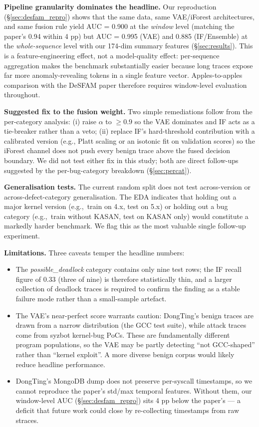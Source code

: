 \documentclass[conference,10pt]{IEEEtran}
\begin{document}
\textbf{Pipeline granularity dominates the headline.} Our reproduction
(\S\ref{sec:desfam_repro}) shows that the same data, same VAE/iForest
architectures, and same fusion rule yield AUC = 0.900 at the
\emph{window} level (matching the paper's 0.94 within 4 pp) but
AUC = 0.995 (VAE) and 0.885 (IF/Ensemble) at the \emph{whole-sequence}
level with our 174-dim summary features (\S\ref{sec:results}). This is a
feature-engineering effect, not a model-quality effect: per-sequence
aggregation makes the benchmark substantially easier because long traces
expose far more anomaly-revealing tokens in a single feature vector.
Apples-to-apples comparison with the DeSFAM paper therefore requires
window-level evaluation throughout.

\textbf{Suggested fix to the fusion weight.} Two simple remediations
follow from the per-category analysis: (i) raise $\alpha$ to
$\geq 0.9$ so the VAE dominates and IF acts as a tie-breaker rather than
a veto; (ii) replace IF's hard-threshold contribution with a calibrated
version (e.g., Platt scaling or an isotonic fit on validation scores) so
the iForest channel does not push every benign trace above the fused
decision boundary. We did not test either fix in this study; both are
direct follow-ups suggested by the per-bug-category breakdown
(\S\ref{sec:percat}).

\textbf{Generalisation tests.} The current random split does not test
across-version or across-defect-category generalisation. The EDA
indicates that holding out a major kernel version (e.g.,~train on 4.x,
test on 5.x) or holding out a bug category (e.g.,~train without KASAN,
test on KASAN only) would constitute a markedly harder benchmark. We
flag this as the most valuable single follow-up experiment.

\textbf{Limitations.} Three caveats temper the headline numbers:

\begin{itemize}
  \item The \emph{possible\_deadlock} category contains only nine test
        rows; the IF recall figure of 0.33 (three of nine) is therefore
        statistically thin, and a larger collection of deadlock traces is
        required to confirm the finding as a stable failure mode rather
        than a small-sample artefact.
  \item The VAE's near-perfect score warrants caution: DongTing's benign
        traces are drawn from a narrow distribution (the GCC test suite),
        while attack traces come from syzbot kernel-bug PoCs. These are
        fundamentally different program populations, so the VAE may be
        partly detecting ``not GCC-shaped'' rather than ``kernel
        exploit''. A more diverse benign corpus would likely reduce
        headline performance.
  \item DongTing's MongoDB dump does not preserve per-syscall timestamps,
        so we cannot reproduce the paper's std/max temporal features.
        Without them, our window-level AUC (\S\ref{sec:desfam_repro}) sits
        4 pp below the paper's --- a deficit that future work could close
        by re-collecting timestamps from raw straces.
\end{itemize}
\end{document}

